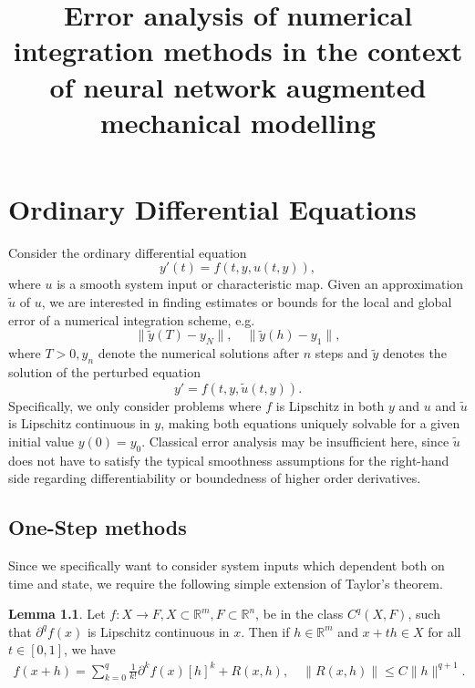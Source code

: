 \documentclass{book}
\theoremstyle{definition}
\newtheorem{lemma}{Lemma}
\begin{document}
\title{Error analysis of numerical integration methods in the context of neural network augmented mechanical modelling}

\chapter{Ordinary Differential Equations}
Consider the ordinary differential equation
\begin{equation}
    y'(t) = f(t, y, u(t, y)),
\end{equation}
where $u$ is a smooth system input or characteristic map. Given an approximation $\tilde{u}$ of $u$, we are interested in finding estimates or bounds for the local and global error of a numerical integration scheme, e.g. 
\begin{equation}
    \lVert \tilde{y}(T) - y_{N} \rVert,\quad \lVert \tilde{y}(h) - y_{1}\rVert,
\end{equation}
where $T > 0, y_{n}$ denote the numerical solutions after $n$ steps and $\tilde{y}$ denotes the solution of the perturbed equation
\begin{equation}\label{eq:perturbed_system}
    y' = f(t, y, \tilde{u}(t, y)).
\end{equation}
Specifically, we only consider problems where $f$ is Lipschitz in both $y$ and $u$ and $\tilde{u}$ is Lipschitz continuous in $y$, making both equations uniquely solvable for a given initial value $y(0) = y_{0}$. Classical error analysis may be insufficient here, since $\tilde{u}$ does not have to satisfy the typical smoothness assumptions for the right-hand side regarding differentiability or boundedness of higher order derivatives.

\section{One-Step methods}
Since we specifically want to consider system inputs which dependent both on time and state, we require the following simple extension of Taylor's theorem. 

\begin{lemma}\label{le:taylor_extension}
    Let $f: X \to F, X\subset \mathbb{R}^{m}, F\subset \mathbb{R}^{n}$, be in the class $C^{q}(X, F)$, such that $\partial^{q}f(x)$ is Lipschitz continuous in $x$. Then if $h\in \mathbb{R}^{m}$ and $x + th \in X$ for all $t\in[0,1]$, we have
    \begin{align*}
        f(x + h) = \sum _{k=0}^{q} \frac{1}{k!}\partial^{k}f(x)[h]^{k} + R(x, h),\quad \lVert R(x, h) \rVert \leq C\lVert h \rVert^{q+1}.
    \end{align*}
\end{lemma}
\end{document}
